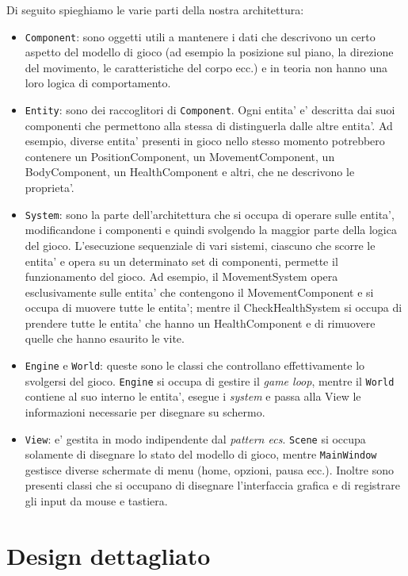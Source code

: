 \documentclass[a4paper,12pt]{report}
\begin{document}
Di seguito spieghiamo le varie parti della nostra architettura:
\begin{itemize}
	\item \texttt{Component}: sono oggetti utili a mantenere i dati che descrivono un certo aspetto del modello di gioco (ad esempio la posizione sul piano, la direzione del movimento, le caratteristiche del corpo ecc.) e in teoria non hanno una loro logica di comportamento.
	\item \texttt{Entity}: sono dei raccoglitori di \texttt{Component}. Ogni entita' e' descritta dai suoi componenti che permettono alla stessa di distinguerla dalle altre entita'. Ad esempio, diverse entita' presenti in gioco nello stesso momento potrebbero contenere un PositionComponent, un MovementComponent, un BodyComponent, un HealthComponent e altri, che ne descrivono le proprieta'.
	\item \texttt{System}: sono la parte dell'architettura che si occupa di operare sulle entita', modificandone i componenti e quindi svolgendo la maggior parte della logica del gioco. L'esecuzione sequenziale di vari sistemi, ciascuno che scorre le entita' e opera su un determinato set di componenti, permette il funzionamento del gioco. Ad esempio, il MovementSystem opera esclusivamente sulle entita' che contengono il MovementComponent e si occupa di muovere tutte le entita'; mentre il CheckHealthSystem si occupa di prendere tutte le entita' che hanno un HealthComponent e di rimuovere quelle che hanno esaurito le vite. 
	\item \texttt{Engine} e \texttt{World}: queste sono le classi che controllano effettivamente lo svolgersi del gioco. \texttt{Engine} si occupa di gestire il \textit{game loop}, mentre il \texttt{World} contiene al suo interno le entita', esegue i \textit{system} e passa alla View le informazioni necessarie per disegnare su schermo.
	\item \texttt{View}: e' gestita in modo indipendente dal \textit{pattern ecs}. \texttt{Scene} si occupa solamente di disegnare lo stato del modello di gioco, mentre \texttt{MainWindow} gestisce diverse schermate di menu (home, opzioni, pausa ecc.). Inoltre sono presenti classi che si occupano di disegnare l'interfaccia grafica e di registrare gli input da mouse e tastiera.
\end{itemize}

\pagebreak

\section{Design dettagliato}
\end{document}
